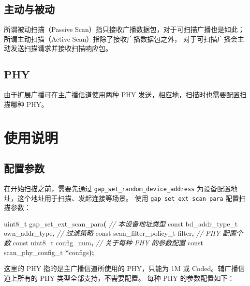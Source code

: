 \documentclass[
  12pt,
]{book}
\newenvironment{Shaded}{\begin{snugshade}}{\end{snugshade}}
\newcommand{\CommentTok}[1]{\textcolor[rgb]{0.56,0.35,0.01}{\textit{#1}}}
\newcommand{\DataTypeTok}[1]{\textcolor[rgb]{0.13,0.29,0.53}{#1}}
\newcommand{\NormalTok}[1]{#1}
\newcommand{\OperatorTok}[1]{\textcolor[rgb]{0.81,0.36,0.00}{\textbf{#1}}}
\begin{document}
\hypertarget{ux4e3bux52a8ux4e0eux88abux52a8}{%
\subsection{主动与被动}\label{ux4e3bux52a8ux4e0eux88abux52a8}}

所谓被动扫描（Passive Scan）指只接收广播数据包，对于可扫描广播也是如此；所谓主动扫描（Active Scan）指除了接收广播数据包之外，
对于可扫描广播会主动发送扫描请求并接收扫描响应包。

\hypertarget{phy-1}{%
\subsection{PHY}\label{phy-1}}

由于扩展广播可在主广播信道使用两种 PHY 发送，相应地，扫描时也需要配置扫描哪种 PHY。

\hypertarget{ux4f7fux7528ux8bf4ux660e-1}{%
\section{使用说明}\label{ux4f7fux7528ux8bf4ux660e-1}}

\hypertarget{ux914dux7f6eux53c2ux6570}{%
\subsection{配置参数}\label{ux914dux7f6eux53c2ux6570}}

在开始扫描之前，需要先通过 \texttt{gap\_set\_random\_device\_address} 为设备配置地址，这个地址用于扫描、发起连接等场景。
使用 \texttt{gap\_set\_ext\_scan\_para} 配置扫描参数：

\begin{Shaded}
\begin{Highlighting}[]
\DataTypeTok{uint8\_t}\NormalTok{ gap\_set\_ext\_scan\_para}\OperatorTok{(}
  \CommentTok{// 本设备地址类型}
  \DataTypeTok{const}\NormalTok{ bd\_addr\_type\_t own\_addr\_type}\OperatorTok{,}
  \CommentTok{// 过滤策略}
  \DataTypeTok{const}\NormalTok{ scan\_filter\_policy\_t filter}\OperatorTok{,}
  \CommentTok{// PHY 配置个数}
  \DataTypeTok{const} \DataTypeTok{uint8\_t}\NormalTok{ config\_num}\OperatorTok{,}
  \CommentTok{// 关于每种 PHY 的参数配置}
  \DataTypeTok{const}\NormalTok{ scan\_phy\_config\_t }\OperatorTok{*}\NormalTok{configs}\OperatorTok{);}
\end{Highlighting}
\end{Shaded}

这里的 PHY 指的是主广播信道所使用的 PHY，只能为 1M 或 Coded。辅广播信道上所有的 PHY 类型全部支持，不需要配置。
每种 PHY 的参数配置如下：
\end{document}
